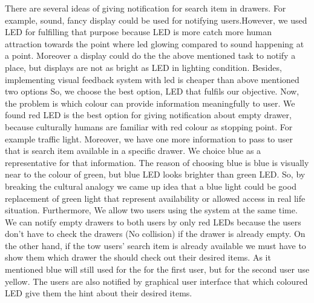 There are several ideas of giving notification for search item in drawers. For example, sound, fancy display could be used for notifying users.However, we used LED for fulfilling that purpose because LED is more catch more human attraction towards the point where led glowing compared to sound happening at a point. Moreover a display could do the the above mentioned task to notify a place, but displays are not as bright as LED  in lighting condition. Besides, implementing visual feedback system with led is cheaper than above mentioned two options So, we choose the best option, LED that fulfils our objective. Now, the problem is which colour can provide information meaningfully to user. We found red LED is the best option for giving notification about empty drawer, because culturally humans are familiar with red colour as stopping point. For example traffic light. Moreover, we have one more information to pass to user that is search item available in a specific drawer. We choice blue as a representative for that information. The reason of choosing blue is blue is visually near to the colour of green, but blue LED looks brighter than green LED. So, by breaking the cultural analogy we came up idea that a blue light could be good replacement of green light that represent availability or allowed access in real life situation. Furthermore, We allow two users using the system at the same time. We can notify empty drawers to both users by only red LEDs because the users don't have to check the drawers (No collision) if the drawer is already empty. On the other hand, if the tow users' search item is already available we must have to show them which drawer the should check out their desired items. As it mentioned blue will still used  for the for the first user, but for the second user use yellow.  The users are also notified by graphical user interface that which coloured LED give them the hint about their desired items.